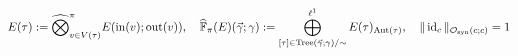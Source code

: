 \documentclass[preview]{standalone}
\begin{document}
\begin{align*}
\special{dvisvgm:raw <g id='unique000'>}E(\tau) := \widehat{\bigotimes}_{v\in V(\tau)}^\pi E(\operatorname{in}(v);\operatorname{out}(v)), \quad \widehat{\mathbb{F}}_\pi(E)(\vec{\gamma};\gamma) := \bigoplus_{[\tau]\in\operatorname{Tree}(\vec{\gamma};\gamma)/\sim}^{\ell^1} E(\tau)_{\operatorname{Aut}(\tau)}, \quad \|\operatorname{id}_c\|_{\mathcal{O}_{\text{syn}}(c;c)} = 1\special{dvisvgm:raw </g>}
\end{align*}
\end{document}
